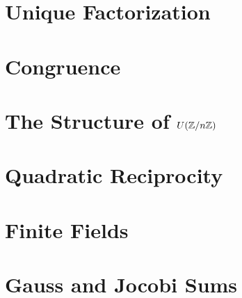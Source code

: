 \documentclass{mynotes}
\begin{document}
\tableofcontents
\chapter{Unique Factorization}






\chapter{Congruence}


\chapter{The Structure of $U(\mathbb{Z}/n\mathbb{Z})$}

\chapter{Quadratic Reciprocity}


\chapter{Finite Fields}





\chapter{Gauss and Jocobi Sums}

\end{document}
